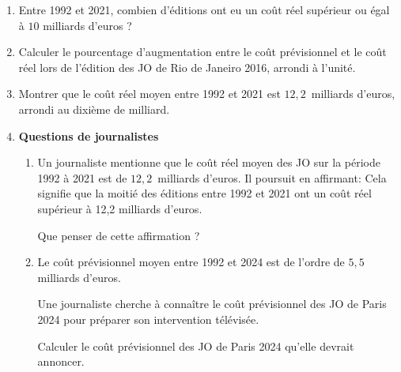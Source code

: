 \documentclass[11pt]{article}
\begin{document}
\begin{exercice}[1]
\begin{enumerate}
\item Entre 1992 et 2021, combien d'éditions ont eu un coût réel supérieur ou égal à $10$ milliards d'euros ?
\item Calculer le pourcentage d'augmentation entre le coût prévisionnel et le coût réel lors de l'édition des JO de Rio de Janeiro 2016, arrondi à l'unité.
\item Montrer que le coût réel moyen entre 1992 et 2021 est $12,2$~milliards d'euros, arrondi au dixième de milliard.
\item \textbf{Questions de journalistes}
\begin{enumerate}
\item Un journaliste mentionne que le coût réel moyen des JO sur la période 1992 à 2021 est de $12,2$~milliards d'euros. Il poursuit en affirmant: \og Cela signifie que la moitié des éditions entre 1992 et 2021 ont un coût réel supérieur à 12,2 milliards d'euros. \fg

Que penser de cette affirmation ?
\item Le coût prévisionnel moyen entre 1992 et 2024 est de l'ordre de $5,5$ milliards d'euros.

Une journaliste cherche à connaître le coût prévisionnel des JO de Paris 2024 pour préparer son intervention télévisée.

Calculer le coût prévisionnel des JO de Paris 2024 qu'elle devrait annoncer.
\end{enumerate}
\end{enumerate}

\bigskip


\end{exercice}
\end{document}
